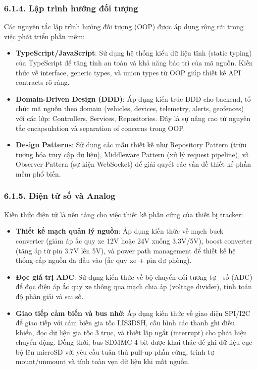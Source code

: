 \documentclass[13pt,a4paper]{extarticle}
\renewcommand{\\}{\thesislongtableorignewline\hline}%
\providecommand{\tightlist}{%
  \setlength{\itemsep}{0pt}\setlength{\parskip}{0pt}}
\begin{document}
\subsubsection{6.1.4. Lập trình hướng đối
tượng}\label{614-lux1eadp-truxecnh-hux1b0ux1edbng-ux111ux1ed1i-tux1b0ux1ee3ng}

Các nguyên tắc lập trình hướng đối tượng (OOP) được áp dụng rộng rãi
trong việc phát triển phần mềm:

\begin{itemize}
\tightlist
\item
  \textbf{TypeScript/JavaScript}: Sử dụng hệ thống kiểu dữ liệu tĩnh
  (static typing) của TypeScript để tăng tính an toàn và khả năng bảo
  trì của mã nguồn. Kiến thức về interface, generic types, và union
  types từ OOP giúp thiết kế API contracts rõ ràng.
\item
  \textbf{Domain-Driven Design (DDD)}: Áp dụng kiến trúc DDD cho
  backend, tổ chức mã nguồn theo domain (vehicles, devices, telemetry,
  alerts, geofences) với các lớp: Controllers, Services, Repositories.
  Đây là sự nâng cao từ nguyên tắc encapsulation và separation of
  concerns trong OOP.
\item
  \textbf{Design Patterns}: Sử dụng các mẫu thiết kế như Repository
  Pattern (trừu tượng hóa truy cập dữ liệu), Middleware Pattern (xử lý
  request pipeline), và Observer Pattern (sự kiện WebSocket) để giải
  quyết các vấn đề thiết kế phần mềm phổ biến.
\end{itemize}

\subsubsection{6.1.5. Điện tử số và
Analog}\label{615-ux111iux1ec7n-tux1eed-sux1ed1-vuxe0-analog}

Kiến thức điện tử là nền tảng cho việc thiết kế phần cứng của thiết bị
tracker:

\begin{itemize}
\tightlist
\item
  \textbf{Thiết kế mạch quản lý nguồn}: Áp dụng kiến thức về mạch buck
  converter (giảm áp ắc quy xe 12V hoặc 24V xuống 3.3V/5V), boost
  converter (tăng áp từ pin 3.7V lên 5V), và power path management để
  thiết kế hệ thống cấp nguồn đa đầu vào (ắc quy xe + pin dự phòng).
\item
  \textbf{Đọc giá trị ADC}: Sử dụng kiến thức về bộ chuyển đổi tương tự
  - số (ADC) để đọc điện áp ắc quy xe thông qua mạch chia áp (voltage
  divider), tính toán độ phân giải và sai số.
\item
  \textbf{Giao tiếp cảm biến và bus nhớ}: Áp dụng kiến thức về giao diện
  SPI/I2C để giao tiếp với cảm biến gia tốc LIS3DSH, cấu hình các thanh
  ghi điều khiển, đọc dữ liệu gia tốc 3 trục, và thiết lập ngắt
  (interrupt) cho phát hiện chuyển động. Đồng thời, bus SDMMC 4-bit được
  khai thác để ghi dữ liệu cục bộ lên microSD với yêu cầu tuân thủ
  pull-up phần cứng, trình tự mount/unmount và tính toàn vẹn dữ liệu khi
  mất nguồn.
\end{itemize}
\end{document}
